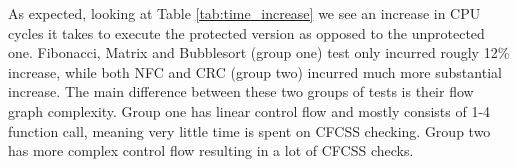 \begin{table}[h]
\centering
{}
\caption{Execution time comparison between unprotected and protected tests}
\label{tab:time_increase}
\end{table}

As expected, looking at Table \ref{tab:time_increase} we see an increase in CPU cycles it takes to execute the protected version as opposed to the unprotected one. Fibonacci, Matrix and Bubblesort (group one) test only incurred rougly 12\% increase, while both NFC and CRC (group two) incurred much more substantial increase. The main difference between these two groups of tests is their flow graph complexity. Group one has linear control flow and mostly consists of 1-4 function call, meaning very little time is spent on CFCSS checking. Group two has more complex control flow resulting in a lot of CFCSS checks.




